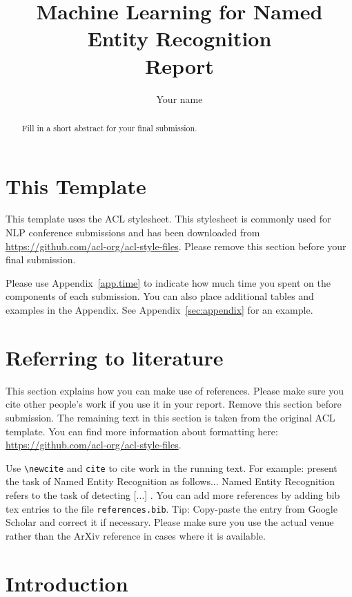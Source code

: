 \documentclass[11pt]{article}
\title{Machine Learning for Named Entity Recognition \\ Report}
\author{Your name }
\begin{document}
\maketitle
\begin{abstract}
Fill in a short abstract for your final submission.
\end{abstract}

\section*{This Template}

This template uses the ACL stylesheet. This stylesheet is commonly used for NLP conference submissions and has been downloaded from \url{https://github.com/acl-org/acl-style-files}. Please remove this section before your final submission. 

Please use Appendix~\ref{app.time} to indicate how much time you spent on the components of each submission. You can also place additional tables and examples in the Appendix. See Appendix~\ref{sec:appendix} for an example.



\section*{Referring to literature}

This section explains how you can make use of references. Please make sure you cite other people's work if you use it in your report. Remove this section before submission. The remaining text in this section is taken from the original ACL template. You can find more information about formatting here: \url{https://github.com/acl-org/acl-style-files}.


Use \verb|\newcite| and \verb|cite| to cite work in the running text. For example:   present the task of Named Entity Recognition as follows... Named Entity Recognition refers to the task of detecting [...] \citep{sang2003introduction}. You can add more references by adding bib tex entries to the file \verb|references.bib|. Tip: Copy-paste the entry from Google Scholar and correct it if necessary. Please make sure you use the actual venue rather than the ArXiv reference in cases where it is available. 



\section{Introduction}
\end{document}
